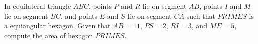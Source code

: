 In equilateral triangle $ABC$, points $P$ and $R$ lie on segment $AB$, points $I$ and $M$ lie on segment $BC$, and points $E$ and $S$ lie on segment $CA$ such that $PRIMES$ is a equiangular hexagon. Given that $AB = 11$, $PS = 2$, $RI = 3$, and $ME = 5$, compute the area of hexagon $PRIMES$.
